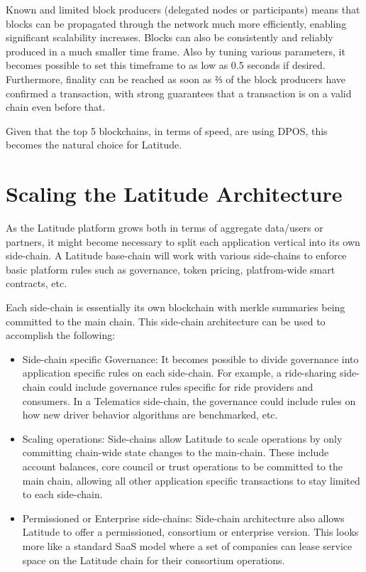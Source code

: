 Known and limited block producers (delegated nodes or participants) means that blocks can be propagated through the
network much more efficiently, enabling significant scalability increases. Blocks can also be consistently and reliably
produced in a much smaller time frame. Also by tuning various parameters, it becomes possible to set this timeframe to
as low as 0.5 seconds if desired.  Furthermore, finality can be reached as soon as ⅔ of the block producers have
confirmed a transaction, with strong guarantees that a transaction is on a valid chain even before that. 

Given that the top 5 blockchains, in terms of speed, are using DPOS, this becomes the natural choice for Latitude.

\newpage
\section{Scaling the Latitude Architecture}
\label{app:latchain}

As the Latitude platform grows both in terms of aggregate data/users or partners, it might become necessary to split
each application vertical into its own side-chain. A Latitude base-chain will work with various side-chains to enforce
basic platform rules such as governance, token pricing, platfrom-wide smart contracts, etc.  

Each side-chain is essentially its own blockchain with merkle summaries being committed to the main chain. This
side-chain architecture can be used to accomplish the following:

\begin{itemize}
  \item Side-chain specific Governance: It becomes possible to divide governance into application specific rules on
        each side-chain. For example, a ride-sharing side-chain could include governance rules specific for ride
        providers and consumers. In a Telematics side-chain, the governance could include rules on how new driver
        behavior algorithms are benchmarked, etc.
  \item Scaling operations: Side-chains allow Latitude to scale operations by only committing chain-wide state changes
      to the main-chain. These include account balances, core council or trust operations to be committed to the main
        chain, allowing all other application specific transactions to stay limited to each side-chain.
  \item Permissioned or Enterprise side-chains: Side-chain architecture also allows Latitude to offer a permissioned,
      consortium or enterprise version. This looks more like a standard SaaS model where a set of companies can lease
        service space on the Latitude chain for their consortium operations.
\end{itemize}

